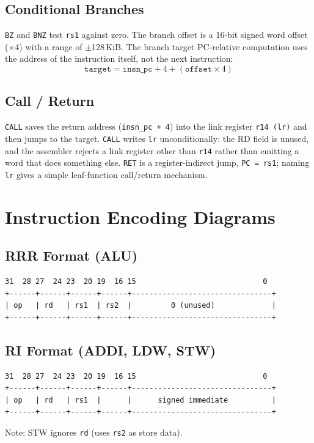 \documentclass[11pt,a4paper]{article}
\begin{document}
\subsection{Conditional Branches}
{\tt BZ} and {\tt BNZ} test {\tt rs1} against zero. The branch offset is a
16-bit signed word offset ($\times$4) with a range of $\pm$128\,KiB. The
branch target PC-relative computation uses the address of the instruction
itself, not the next instruction:
\[
\texttt{target} = \texttt{insn\_pc} + 4 + (\texttt{offset} \times 4)
\]

\subsection{Call / Return}
{\tt CALL} saves the return address ({\tt insn\_pc + 4}) into the link register
{\tt r14 (lr)} and then jumps to the target. {\tt CALL} writes {\tt lr}
unconditionally: the RD field is unused, and the assembler rejects a link
register other than {\tt r14} rather than emitting a word that does something
else. {\tt RET} is a register-indirect jump, {\tt PC = rs1}; naming {\tt lr}
gives a simple leaf-function call/return mechanism.

\newpage

\section{Instruction Encoding Diagrams}

\subsection{RRR Format (ALU)}
\begin{lstlisting}[style=Cstyle]
  31  28 27  24 23  20 19  16 15                             0
+------+------+------+------+--------------------------------+
| op   | rd   | rs1  | rs2  |         0 (unused)             |
+------+------+------+------+--------------------------------+
\end{lstlisting}

\subsection{RI Format (ADDI, LDW, STW)}
\begin{lstlisting}[style=Cstyle]
  31  28 27  24 23  20 19  16 15                             0
+------+------+------+------+--------------------------------+
| op   | rd   | rs1  |      |      signed immediate          |
+------+------+------+------+--------------------------------+
\end{lstlisting}
Note: STW ignores {\tt rd} (uses {\tt rs2} as store data).
\end{document}
